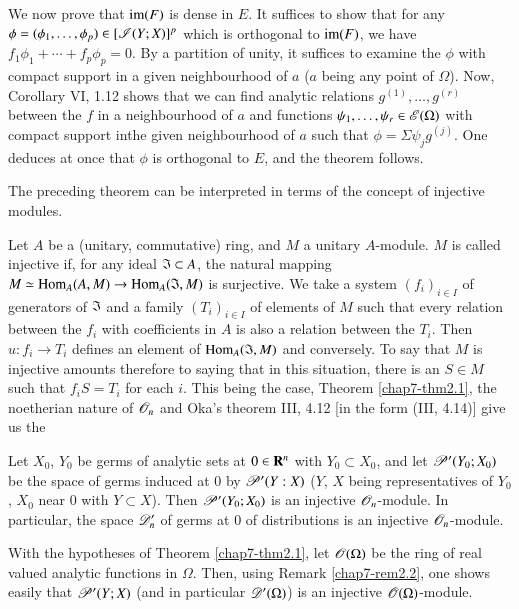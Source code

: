 We now prove that $\operatorname{im}(F)$ is dense in $E$. It suffices to show that for any $\phi=(\phi_{1},\ldots,\phi_{p})\in [\mathscr{I}(Y;X)]^{p}$ which is orthogonal to $\operatorname{im}(F)$, we have $f_{1}\phi_{1}+\cdots+f_{p}\phi_{p}=0$. By a partition of unity, it suffices to examine the $\phi$ with compact support in a given neighbourhood of $a$ ($a$ being any point of $\Omega$). Now, Corollary VI, 1.12 shows that we can find analytic relations $g^{(1)},\ldots,g^{(r)}$ between the $f$ in a neighbourhood of $a$ and functions $\psi_{1},\ldots,\psi_{r}\in \mathscr{E}(\Omega)$ with compact support in\pageoriginale the given neighbourhood of $a$ such that $\phi=\Sigma\psi_{j}g^{(j)}$. One deduces at once that $\phi$ is orthogonal to $E$, and the theorem follows.

The preceding theorem can be interpreted in terms of the concept of injective modules.

Let $A$ be a (unitary, commutative) ring, and $M$ a unitary $A$-module. $M$ is called injective if, for any ideal $\mathfrak{I}\subset A$, the natural mapping $M\simeq \operatorname{Hom}_{A}(A,M)\to \operatorname{Hom}_{A}(\mathfrak{I},M)$ is surjective. We take a system $(f_{i})_{i\in I}$ of generators of $\mathfrak{I}$ and a family $(T_{i})_{i\in I}$ of elements of $M$ such that every relation between the $f_{i}$ with coefficients in $A$ is also a relation between the $T_{i}$. Then $u:f_{i}\to T_{i}$ defines an element of $\operatorname{Hom}_{A}(\mathfrak{I},M)$ and conversely. To say that $M$ is injective amounts therefore to saying that in this situation, there is an $S\in M$ such that $f_{i}S=T_{i}$ for each $i$. This being the case, Theorem \ref{chap7-thm2.1}, the noetherian nature of $\mathscr{O}_{n}$ and Oka's theorem III, 4.12 [in the form (III, 4.14)] give us the

\begin{theorem}\label{chap7-thm2.4}
Let $X_{0}$, $Y_{0}$ be germs of analytic sets at $0\in \mathbf{R}^{n}$ with $Y_{0}\subset X_{0}$, and let $\mathscr{P}'(Y_{0};X_{0})$ be the space of germs induced at $0$ by $\mathscr{P}'(Y:X)$ ($Y$, $X$ being representatives of $Y_{0}$, $X_{0}$ near $0$ with $Y\subset X$). Then $\mathscr{P}'(Y_{0};X_{0})$ is an injective $\mathscr{O}_{n}$-module. In particular, the space $\mathscr{D}'_{n}$ of germs at $0$ of distributions is an injective $\mathscr{O}_{n}$-module.
\end{theorem}

\begin{remark}\label{chap7-rem2.5}
With the hypotheses of Theorem \ref{chap7-thm2.1}, let $\mathscr{O}(\Omega)$ be the ring of real valued analytic functions in $\Omega$. Then, using Remark \ref{chap7-rem2.2}, one shows easily that $\mathscr{P}'(Y;X)$ (and in particular $\mathscr{D}'(\Omega)$) is an injective $\mathscr{O}(\Omega)$-module.
\end{remark}

